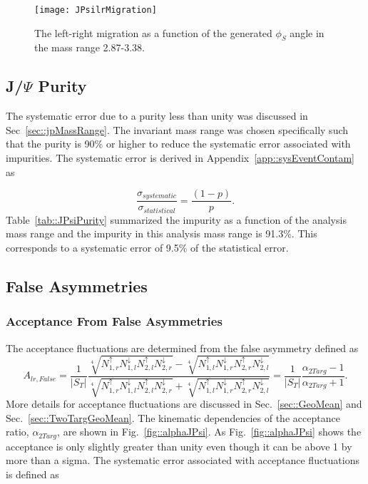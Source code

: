 \begin{figure}[h!t]
  \centering \texttt{[image: JPsilrMigration]}
  \caption{The left-right migration as a function of the generated $\phi_S$
    angle in the mass range 2.87-3.38.}
  \label{fig::JPsilrMigration}
\end{figure}

\subsection{J/$\Psi$ Purity}

The systematic error due to a {\jp} purity less than unity was discussed in
Sec~\ref{sec::jpMassRange}.  The invariant mass range was chosen specifically
such that the {\jp} purity is 90\% or higher to reduce the systematic error
associated with impurities.  The systematic error is derived in
Appendix~\ref{app::sysEventContam} as

\begin{equation}
  \frac{\sigma_{systematic}}{\sigma_{statistical}} = \frac{(1-p)}{p}.
\end{equation}
\noindent
Table~\ref{tab::JPsiPurity} summarized the impurity as a function of the
analysis mass range and the impurity in this analysis mass range is 91.3\%.
This corresponds to a systematic error of 9.5\% of the statistical error.

\subsection{False Asymmetries}
\subsubsection{Acceptance From False Asymmetries}
The acceptance fluctuations are determined from the false asymmetry defined as
\begin{equation}
  A_{lr,False} = 
    \frac{1}{|S_T|}
    \frac{
      \sqrt[4]{
        N_{1,r}^\uparrow N_{1, l}^\downarrow
        N_{2,l}^\uparrow N_{2, r}^\downarrow
      } 
      -\sqrt[4]{
        N_{1,l}^\uparrow N_{1, r}^\downarrow
        N_{2,r}^\uparrow N_{2, l}^\downarrow
      }
    }{
      \sqrt[4]{
        N_{1,r}^\uparrow N_{1, l}^\downarrow
        N_{2,l}^\uparrow N_{2, r}^\downarrow
      } +
      \sqrt[4]{
        N_{1,l}^\uparrow N_{1, r}^\downarrow
        N_{2,r}^\uparrow N_{2, l}^\downarrow
      }
    } 
    = \frac{1}{|S_T|}
    \frac{
      \alpha_{2Targ} - 1     
    }{
      \alpha_{2Targ} + 1
    }.
    \label{equ::falseAccJPsi}
\end{equation}
\noindent
More details for acceptance fluctuations are discussed in
Sec.~\ref{sec::GeoMean} and Sec.~\ref{sec::TwoTargGeoMean}.  The kinematic
dependencies of the acceptance ratio, $\alpha_{2Targ}$, are shown in
Fig.~\ref{fig::alphaJPsi}.  As Fig.~\ref{fig::alphaJPsi} shows the acceptance is
only slightly greater than unity even though it can be above 1 by more than a
sigma.  The systematic error associated with acceptance fluctuations is defined
as

